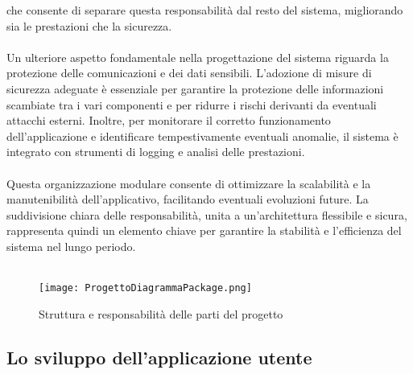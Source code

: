 che consente di separare questa responsabilità dal resto del sistema, migliorando sia le prestazioni che la sicurezza.\\
\\
Un ulteriore aspetto fondamentale nella progettazione del sistema riguarda la protezione delle comunicazioni e dei dati sensibili.
L’adozione di misure di sicurezza adeguate è essenziale per garantire la protezione delle informazioni scambiate tra i vari componenti e
per ridurre i rischi derivanti da eventuali attacchi esterni.
Inoltre, per monitorare il corretto funzionamento dell’applicazione e identificare tempestivamente eventuali anomalie,
il sistema è integrato con strumenti di logging e analisi delle prestazioni.\\
\\
Questa organizzazione modulare consente di ottimizzare la scalabilità e la manutenibilità dell’applicativo,
facilitando eventuali evoluzioni future.
La suddivisione chiara delle responsabilità, unita a un’architettura flessibile e sicura,
rappresenta quindi un elemento chiave per garantire la stabilità e l’efficienza del sistema nel lungo periodo.\\
\\

\begin{figure}[h!]
    \centering
    \texttt{[image: ProgettoDiagrammaPackage.png]}
    \caption{Struttura e responsabilità delle parti del progetto}
\end{figure}

\clearpage
\subsection{Lo sviluppo dell'applicazione utente}

